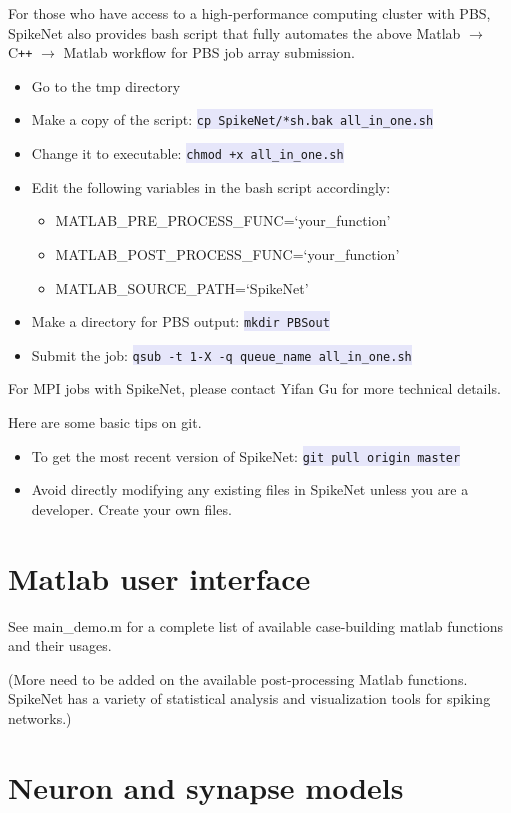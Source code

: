 \documentclass{article}
\newcommand{\mylstinline}[1] {\colorbox{Lavender}{\lstinline[basicstyle=\ttfamily\footnotesize\color{Black}]|#1|} }
\begin{document}
For those who have access to a high-performance computing cluster with PBS, SpikeNet also provides bash script that fully automates the above Matlab $\rightarrow$  C\texttt{++}  $\rightarrow$ Matlab workflow for PBS job array submission. 
\begin{itemize}
\item Go to the tmp directory
\item Make a copy of the script: \mylstinline{cp SpikeNet/*sh.bak all_in_one.sh}
\item Change it to executable: \mylstinline{chmod +x all_in_one.sh}
\item Edit the following variables in the bash script accordingly: 
\begin{itemize}
\item {\footnotesize MATLAB\_PRE\_PROCESS\_FUNC=`your\_function'}
\item {\footnotesize MATLAB\_POST\_PROCESS\_FUNC=`your\_function'}
\item {\footnotesize MATLAB\_SOURCE\_PATH=`SpikeNet'}
\end{itemize}
\item Make a directory for PBS output: \mylstinline{mkdir PBSout}
\item Submit the job: \mylstinline{qsub -t 1-X -q queue_name all_in_one.sh}
\end{itemize}
For MPI jobs with SpikeNet, please contact Yifan Gu for more technical details.

Here are some basic tips on git.
\begin{itemize}
\item To get the most recent version of SpikeNet: \mylstinline{git pull origin master}
\item Avoid directly modifying any existing files in SpikeNet unless you are a developer. Create your own files.
\end{itemize} 

\section{Matlab user interface}
\label{sec:matlab user interface}
See main\_demo.m for a complete list of available case-building matlab functions and their usages.

(More need to be added on the available post-processing Matlab functions. SpikeNet has a variety of statistical analysis and visualization tools for spiking networks.)

\section{Neuron and synapse models}
\label{sec:model}
\end{document}
